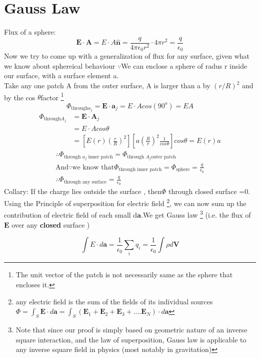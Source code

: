 \documentclass[12 pt , twoside, letterpaper] {article}
\renewcommand{\vec}[1]{\mathbf{#1}}
\let\oldhat\hat
\renewcommand{\hat}[1]{\oldhat{\mathbf{#1}}}
\begin{document}
\section{Gauss Law}
Flux of a sphere:
$$\vec E\cdot \vec A=E\cdot A\hat n=\frac {q}{4\pi \epsilon_0 r^2}\cdot 4 \pi r^2=\frac {q}{\epsilon_0}$$
Now we try to come up with a generalization of flux for any surface, given what we know about sphereical behaviour
 $\because$We can enclose a sphere of radus r inside our surface, with a surface element a. \\Take any one patch A from the outer surface, A is larger than a by $(r/R)^2$ and by the cos $\theta$factor \footnote{The unit vector of the patch is not necessarily same as the sphere that encloses it.} 
 $$\Phi_{\text{through} a_j}=\vec E \cdot \vec a_j=E \cdot A cos (90^o)= E A$$
 \begin{align*}
  \Phi_{\text{through} A_j}&=\vec E \cdot \vec A_j
 \\&=E \cdot A cos\theta
 \\&=[E(r)(\frac{r}{R})^2][a(\frac{R}{r})^2\frac {1}{cos \theta}]cos \theta= E(r)a
\end{align*}
\begin{align*}
\therefore \Phi_{\text{through $a_j$ inner patch}}=\Phi_{\text{through $A_j$outer patch}}
\\\text{And} \because \text{we know that}  \Phi_{\text{through inner patch}}= \Phi_{\text{sphere}}=\frac {q}{\epsilon_0}
\\ \therefore \Phi_{\text{through any surface}}=\frac {q}{\epsilon_0}
\end{align*}
Collary: If the charge lies outside the surface , then$\Phi$ through closed surface =0.
\\Using the Principle of superposition for electric field \footnote{ any electric field is the sum of the fields of its individual sources
$\Phi= \int_S \vec E \cdot d\vec a=\int_S (\vec E_1+ \vec E_2+\vec E_3+....\vec E_N)\cdot d\vec a $}, we can now sum up the contribution of electric field of each small d$\vec a$.We get Gauss law \footnote{Note that since our proof is simply based on geometric nature of an inverse square interaction, and the law of superposition, Gauss law is applicable to any inverse square field in physics (most notably in gravitation)} (i.e. the flux of $\vec E$ over any \textbf{closed}  surface )

$$\int E \cdot d\vec a = \frac{1}{\epsilon_0}\sum_i q_i = \frac{1}{\epsilon_0} \int \rho d\vec V$$
\end{document}
